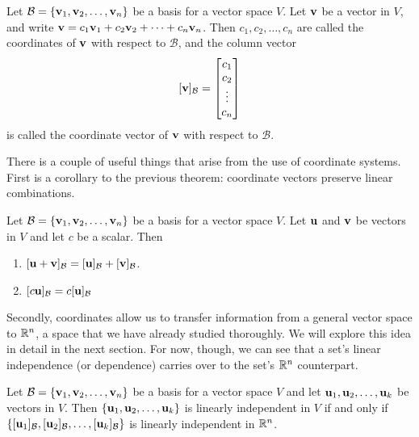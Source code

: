 \documentclass[../m73main.tex]{subfiles}
\begin{document}
\begin{definition}
	Let $\mathcal{B} = \{\mathbf{v}_1, \mathbf{v}_2, \ldots, \mathbf{v}_n\}$ be a basis for a vector space $V$.
	Let $\mathbf{v}$ be a vector in $V$, and write $\mathbf{v} = c_1 \mathbf{v}_1 + c_2 \mathbf{v}_2 + \cdots + c_n \mathbf{v}_n$.
	Then $c_1, c_2, \ldots, c_n$ are called the coordinates of $\mathbf{v}$ with respect to $\mathcal{B}$, and the column vector
	\[ [\mathbf{v}]_{\mathcal{B}} = \begin{bmatrix} c_1 \\ c_2 \\ \vdots \\ c_n \end{bmatrix} \]
	is called the coordinate vector of $\mathbf{v}$ with respect to $\mathcal{B}$.
\end{definition}

There is a couple of useful things that arise from the use of coordinate systems.
First is a corollary to the previous theorem: coordinate vectors preserve linear combinations.

\begin{theorem}
	Let $\mathcal{B} = \{\mathbf{v}_1, \mathbf{v}_2, \ldots, \mathbf{v}_n\}$ be a basis for a vector space $V$.
	Let $\mathbf{u}$ and $\mathbf{v}$ be vectors in $V$ and let $c$ be a scalar.
	Then
	\begin{enumerate}[label=(\alph*)]
		\item $[\mathbf{u} + \mathbf{v}]_{\mathcal{B}} = [\mathbf{u}]_{\mathcal{B}} + [\mathbf{v}]_{\mathcal{B}}$.
		\item $[c \mathbf{u}]_{\mathcal{B}} = c[\mathbf{u}]_{\mathcal{B}}$
	\end{enumerate}
\end{theorem}

Secondly, coordinates allow us to transfer information from a general vector space to $\mathbb{R}^n$, a space that we have already studied thoroughly.
We will explore this idea in detail in the next section.
For now, though, we can see that a set's linear independence (or dependence) carries over to the set's $\mathbb{R}^n$ counterpart.

\begin{theorem}
	Let $\mathcal{B} = \{\mathbf{v}_1, \mathbf{v}_2, \ldots, \mathbf{v}_n\}$ be a basis for a vector space $V$ and let $\mathbf{u}_1, \mathbf{u}_2, \ldots, \mathbf{u}_k$ be vectors in $V$.
	Then $\{\mathbf{u}_1, \mathbf{u}_2, \ldots, \mathbf{u}_k	\}$ is linearly independent in $V$ if and only if $\{[\mathbf{u}_1]_{\mathcal{B}}, [\mathbf{u}_2]_{\mathcal{B}}, \ldots, [\mathbf{u}_k]_{\mathcal{B}}\}$ is linearly independent in $\mathbb{R}^n$.
\end{theorem}
\end{document}
